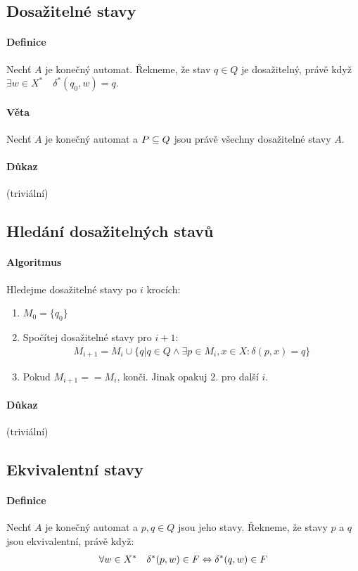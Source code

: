 \documentclass[a4paper,12pt,titlepage]{article}
\begin{document}
\subsection{Dosažitelné stavy}
\setcounter{equation}{0}
\paragraph{Definice}
Nechť $A$ je konečný automat. Řekneme, že stav $q \in Q$ je dosažitelný, právě když
$\exists w \in X^* \quad \delta^*(q_0, w) = q$.
\paragraph{Věta}
Nechť $A$ je konečný automat a $P \subseteq Q$ jsou právě všechny dosažitelné stavy
$A$.
\paragraph{Důkaz} (triviální)
\subsection{Hledání dosažitelných stavů}
\setcounter{equation}{0}
\paragraph{Algoritmus}
Hledejme dosažitelné stavy po $i$ krocích:
\begin{enumerate}
	\item $M_0 = \{q_0\}$
	\item Spočítej dosažitelné stavy pro $i+1$:
	\begin{align}
		M_{i+1} = M_i \cup \{ q | q \in Q \land \exists p \in M_i, x \in
		X: \delta(p, x) = q \}
	\end{align}
	\item Pokud $M_{i+1} == M_i$, konči. Jinak opakuj 2. pro další $i$.
\end{enumerate}
\paragraph{Důkaz} (triviální)
\subsection{Ekvivalentní stavy}
\setcounter{equation}{0}
\paragraph{Definice}
Nechť $A$ je konečný automat a $p, q \in Q$ jsou jeho stavy. Řekneme, že stavy
$p$ a $q$ jsou ekvivalentní, právě když:
\begin{align}
	\forall w \in X^* \quad \delta^*(p, w) \in F \Leftrightarrow \delta^*(q,w) \in F
\end{align}
\end{document}
